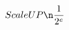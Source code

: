 \documentclass[preview]{standalone}
\begin{document}
\begin{align*}
Scale UP \n \frac{1}{2^e}
\end{align*}
\end{document}
